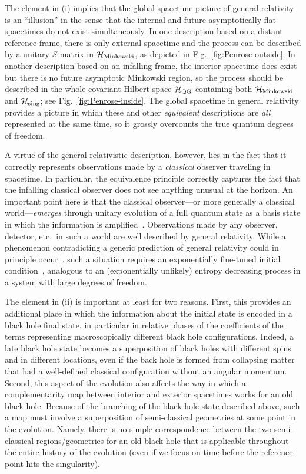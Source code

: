 \documentclass[12pt]{article}
\begin{document}
The element in (i) implies that the global spacetime picture of general 
relativity is an ``illusion'' in the sense that the internal and future 
asymptotically-flat spacetimes do not exist simultaneously.  In one 
description based on a distant reference frame, there is only external 
spacetime and the process can be described by a unitary $S$-matrix in 
${\cal H}_{\rm Minkowski}$, as depicted in Fig.~\ref{fig:Penrose-outside}. 
In another description based on an infalling frame, the interior spacetime 
does exist but there is no future asymptotic Minkowski region, so 
the process should be described in the whole covariant Hilbert space 
${\cal H}_{\rm QG}$ containing both ${\cal H}_{\rm Minkowski}$ and 
${\cal H}_{\rm sing}$; see Fig.~\ref{fig:Penrose-inside}.  The global 
spacetime in general relativity provides a picture in which these and 
other {\it equivalent} descriptions are {\it all} represented at the 
same time, so it grossly overcounts the true quantum degrees of freedom.

A virtue of the general relativistic description, however, lies in the 
fact that it correctly represents observations made by a {\it classical} 
observer traveling in spacetime.  In particular, the equivalence 
principle correctly captures the fact that the infalling classical 
observer does not see anything unusual at the horizon.  An important 
point here is that the classical observer---or more generally a 
classical world---{\it emerges} through unitary evolution of a 
full quantum state as a basis state in which the information is 
amplified~\cite{q-Darwinism,Nomura:2011rb}.  Observations made by 
any observer, detector, etc.\ in such a world are well described by 
general relativity.  While a phenomenon contradicting a generic prediction 
of general relativity could in principle occur~\cite{Almheiri:2012rt}, 
such a situation requires an exponentially fine-tuned initial 
condition~\cite{Nomura:2012sw}, analogous to an (exponentially 
unlikely) entropy decreasing process in a system with large degrees 
of freedom.

The element in (ii) is important at least for two reasons.  First, 
this provides an additional place in which the information about 
the initial state is encoded in a black hole final state, in particular 
in relative phases of the coefficients of the terms representing 
macroscopically different black hole configurations.  Indeed, a late 
black hole state becomes a superposition of black holes with different 
spins and in different locations, even if the back hole is formed 
from collapsing matter that had a well-defined classical configuration 
without an angular momentum.  Second, this aspect of the evolution also 
affects the way in which a complementarity map between interior and 
exterior spacetimes works for an old black hole.  Because of the branching 
of the black hole state described above, such a map must involve a 
superposition of semi-classical geometries at some point in the evolution. 
Namely, there is no simple correspondence between the two semi-classical 
regions/geometries for an old black hole that is applicable throughout 
the entire history of the evolution (even if we focus on time before 
the reference point hits the singularity).
\end{document}

